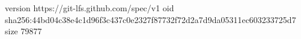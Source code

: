 version https://git-lfs.github.com/spec/v1
oid sha256:44bd04c38e4c1d96f3c437c0e2327f87732f72d2a7d9da05311ec603233725d7
size 79877
